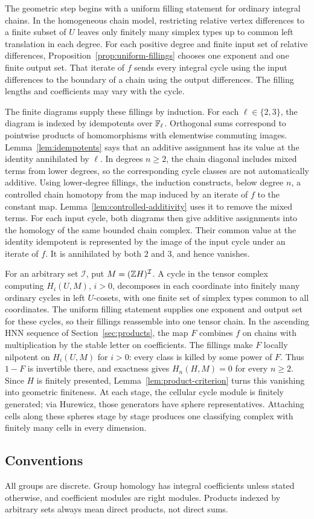 The geometric step begins with a uniform filling statement for ordinary
integral chains. In the homogeneous chain model, restricting relative
vertex differences to a finite subset of $U$ leaves only finitely many
simplex types up to common left translation in each degree. For each
positive degree and finite input set of relative differences,
Proposition~\ref{prop:uniform-fillings} chooses one exponent and one
finite output set. That iterate of $f$ sends every integral cycle using
the input differences to the boundary of a chain using the output
differences. The filling lengths and coefficients may vary with the cycle.

The finite diagrams supply these fillings by induction. For each
$\ell\in\{2,3\}$, the diagram is indexed by idempotents over
$\mathbb F_\ell$. Orthogonal sums correspond to pointwise products of
homomorphisms with elementwise commuting images.
Lemma~\ref{lem:idempotents} says that an additive assignment has its
value at the identity annihilated by $\ell$. In degrees $n\ge2$, the
chain diagonal includes mixed terms from lower degrees, so the
corresponding cycle classes are not automatically additive. Using
lower-degree fillings, the induction constructs, below degree $n$, a
controlled chain homotopy from the map induced by an iterate of $f$ to
the constant map. Lemma~\ref{lem:controlled-additivity} uses it to
remove the mixed terms. For each input cycle, both diagrams then give
additive assignments into the homology of the same bounded chain
complex. Their common value at the identity idempotent is represented
by the image of the input cycle under an iterate of $f$. It is
annihilated by both $2$ and $3$, and hence vanishes.

For an arbitrary set $\mathcal I$, put $M=(\mathbb Z H)^{\mathcal I}$. A cycle
in the tensor complex computing $H_i(U,M)$, $i>0$, decomposes in each
coordinate into finitely many ordinary cycles in left $U$-cosets, with
one finite set of simplex types common to all coordinates. The uniform
filling statement supplies one exponent and output set for these cycles,
so their fillings reassemble into one tensor chain. In the ascending HNN
sequence of Section~\ref{sec:products}, the map $F$ combines $f$ on
chains with multiplication by the stable letter on coefficients. The
fillings make $F$ locally nilpotent on $H_i(U,M)$ for $i>0$: every class
is killed by some power of $F$. Thus $1-F$ is invertible there, and
exactness gives $H_n(H,M)=0$ for every $n\ge2$. Since $H$ is finitely
presented, Lemma~\ref{lem:product-criterion} turns this vanishing into
geometric finiteness. At each stage, the cellular cycle module is
finitely generated; via Hurewicz, those generators have sphere
representatives. Attaching cells along these spheres stage by stage
produces one classifying complex with finitely many cells in every
dimension.

\subsection*{Conventions}

All groups are discrete. Group homology has integral coefficients
unless stated otherwise, and coefficient modules are right modules.
Products indexed by arbitrary sets always mean direct products, not
direct sums.
